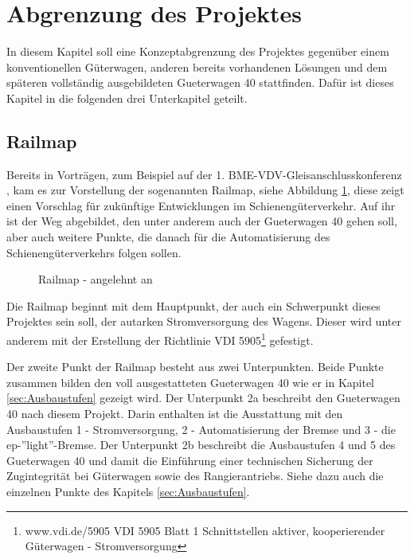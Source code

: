 \section{Abgrenzung des Projektes}
In diesem Kapitel soll eine Konzeptabgrenzung des Projektes gegenüber einem konventionellen Güterwagen, anderen bereits vorhandenen Lösungen und dem späteren vollständig ausgebildeten \gls{Gueterwagen 40} stattfinden. Dafür ist dieses Kapitel in die folgenden drei Unterkapitel geteilt.

\subsection{Railmap}
Bereits in Vorträgen, zum Beispiel auf der 1. BME-VDV-Gleisanschlusskonferenz \cite{GAK}, kam es zur Vorstellung der sogenannten Railmap, siehe Abbildung \ref{fig:Railmap}, diese zeigt einen Vorschlag für zukünftige Entwicklungen im Schienengüterverkehr. Auf ihr ist der Weg abgebildet, den unter anderem auch der \gls{Gueterwagen 40}  gehen soll, aber auch weitere Punkte, die danach für die Automatisierung des Schienengüterverkehrs folgen sollen.\par
\begin{figure}[hbp]
    \centering
    
    \caption{Railmap - angelehnt an \cite{GAK}}
    \label{fig:Railmap}
\end{figure}
Die Railmap beginnt mit dem Hauptpunkt, der auch ein Schwerpunkt dieses Projektes sein soll, der autarken Stromversorgung des Wagens. Dieser wird unter anderem mit der Erstellung der Richtlinie VDI 5905\footnote{www.vdi.de/5905 VDI 5905 Blatt 1 Schnittstellen aktiver, kooperierender Güterwagen - Stromversorgung} gefestigt.\par
Der zweite Punkt der Railmap besteht aus zwei Unterpunkten. Beide Punkte zusammen bilden den voll ausgestatteten \gls{Gueterwagen 40} wie er in Kapitel \ref{sec:Ausbaustufen} gezeigt wird. %
Der Unterpunkt 2a beschreibt den \gls{Gueterwagen 40} nach diesem Projekt. Darin enthalten ist die Ausstattung mit den Ausbaustufen 1 - Stromversorgung, 2 - Automatisierung der Bremse und 3 - die ep-''light''-Bremse. %
Der Unterpunkt 2b beschreibt die Ausbaustufen 4 und 5 des \gls{Gueterwagen 40} und damit die Einführung einer technischen Sicherung der Zugintegrität bei Güterwagen sowie des Rangierantriebs. Siehe dazu auch die einzelnen Punkte des Kapitels \ref{sec:Ausbaustufen}.\par
